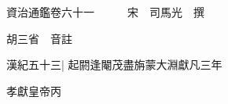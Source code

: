 






























































資治通鑑卷六十一　　　宋　司馬光　撰

胡三省　音註

漢紀五十三|{
	起閼逢閹茂盡旃蒙大淵獻凡三年}


孝獻皇帝丙

